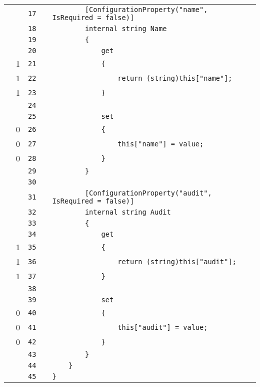 \documentclass[a4paper,10pt]{article}
\begin{document}
\begin{longtable}[l]{lrrll}
\cellcolor{gray} &  & \verb~17~ & & \verb~        [ConfigurationProperty("name", IsRequired = false)]~\\
\cellcolor{gray} &  & \verb~18~ & & \verb~        internal string Name~\\
\cellcolor{gray} &  & \verb~19~ & & \verb~        {~\\
\cellcolor{gray} &  & \verb~20~ & & \verb~            get~\\
\cellcolor{green} & 1 & \verb~21~ & & \verb~            {~\\
\cellcolor{green} & 1 & \verb~22~ & & \verb~                return (string)this["name"];~\\
\cellcolor{green} & 1 & \verb~23~ & & \verb~            }~\\
\cellcolor{gray} &  & \verb~24~ & & \verb~~\\
\cellcolor{gray} &  & \verb~25~ & & \verb~            set~\\
\cellcolor{red} & 0 & \verb~26~ & & \verb~            {~\\
\cellcolor{red} & 0 & \verb~27~ & & \verb~                this["name"] = value;~\\
\cellcolor{red} & 0 & \verb~28~ & & \verb~            }~\\
\cellcolor{gray} &  & \verb~29~ & & \verb~        }~\\
\cellcolor{gray} &  & \verb~30~ & & \verb~~\\
\cellcolor{gray} &  & \verb~31~ & & \verb~        [ConfigurationProperty("audit", IsRequired = false)]~\\
\cellcolor{gray} &  & \verb~32~ & & \verb~        internal string Audit~\\
\cellcolor{gray} &  & \verb~33~ & & \verb~        {~\\
\cellcolor{gray} &  & \verb~34~ & & \verb~            get~\\
\cellcolor{green} & 1 & \verb~35~ & & \verb~            {~\\
\cellcolor{green} & 1 & \verb~36~ & & \verb~                return (string)this["audit"];~\\
\cellcolor{green} & 1 & \verb~37~ & & \verb~            }~\\
\cellcolor{gray} &  & \verb~38~ & & \verb~~\\
\cellcolor{gray} &  & \verb~39~ & & \verb~            set~\\
\cellcolor{red} & 0 & \verb~40~ & & \verb~            {~\\
\cellcolor{red} & 0 & \verb~41~ & & \verb~                this["audit"] = value;~\\
\cellcolor{red} & 0 & \verb~42~ & & \verb~            }~\\
\cellcolor{gray} &  & \verb~43~ & & \verb~        }~\\
\cellcolor{gray} &  & \verb~44~ & & \verb~    }~\\
\cellcolor{gray} &  & \verb~45~ & & \verb~}~\\
\end{longtable}
\newpage
\end{document}
